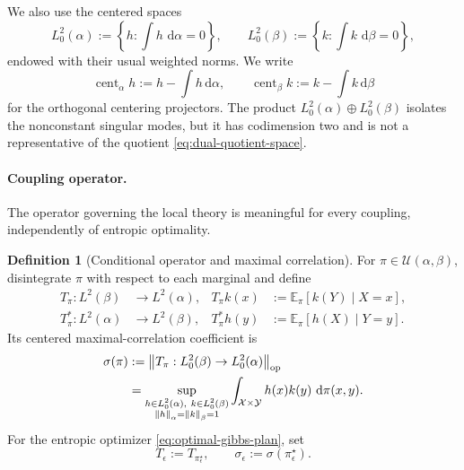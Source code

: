 \documentclass[11pt]{article}
\theoremstyle{definition}
\newtheorem{definition}[proposition]{Definition}
\theoremstyle{remark}
\newcommand{\E}{\mathbb{E}}
\newcommand{\eps}{\epsilon}
\newcommand{\al}{\alpha}
\newcommand{\be}{\beta}
\newcommand{\Xx}{\mathcal{X}}
\newcommand{\Yy}{\mathcal{Y}}
\newcommand{\Couplings}{\mathcal{U}}
\newcommand{\dd}{\,\mathrm{d}}
\newcommand{\norm}[1]{\left\lVert #1\right\rVert}
\newcommand{\opnorm}[1]{\left\lVert #1\right\rVert_{\mathrm{op}}}
\begin{document}
We also use the centered spaces
\[
  L_0^2(\al):=\left\{h:\int h\,\dd\al=0\right\},
  \qquad
  L_0^2(\be):=\left\{k:\int k\,\dd\be=0\right\},
\]
endowed with their usual weighted norms. We write
\begin{equation}
  \label{eq:centering-projectors}
  \operatorname{cent}_{\al}h:=h-\int h\dd\al,
  \qquad
  \operatorname{cent}_{\be}k:=k-\int k\dd\be
\end{equation}
for the orthogonal centering projectors.
The product $L_0^2(\al)\oplus L_0^2(\be)$ isolates the nonconstant
singular modes, but it has codimension two and is not a representative
of the quotient \eqref{eq:dual-quotient-space}.

\paragraph{Coupling operator.}
The operator governing the local theory is meaningful for every
coupling, independently of entropic optimality.

\begin{definition}[Conditional operator and maximal correlation]
  \label{def:coupling-operator}
  For $\pi\in\Couplings(\al,\be)$, disintegrate $\pi$ with respect to
  each marginal and define
  \begin{align}
    T_\pi:L^2(\be)&\longrightarrow L^2(\al),
    &T_\pi k(x)&:=\E_\pi[k(Y)\mid X=x],
    \label{eq:Tpi-definition}
    \\
    T_\pi^\ast:L^2(\al)&\longrightarrow L^2(\be),
    &T_\pi^\ast h(y)&:=\E_\pi[h(X)\mid Y=y].
    \label{eq:Tpi-adjoint-definition}
  \end{align}
  Its centered maximal-correlation coefficient is
  \begin{align}
    \sigma(\pi)
    &:=
    \opnorm{T_\pi:L_0^2(\be)\to L_0^2(\al)}
    \label{eq:sigma-pi-definition}
    \\
    &=
    \sup_{\substack{h\in L_0^2(\al),\ k\in L_0^2(\be)\\
                     \norm{h}_\al=\norm{k}_\be=1}}
    \int_{\Xx\times\Yy}h(x)k(y)\,\dd\pi(x,y).
    \notag
  \end{align}
  For the entropic optimizer \eqref{eq:optimal-gibbs-plan}, set
  \begin{equation}
    \label{eq:optimal-coupling-operator}
    T_\eps:=T_{\pi_\eps^\star},
    \qquad
    \sigma_\eps:=\sigma(\pi_\eps^\star).
  \end{equation}
\end{definition}
\end{document}
